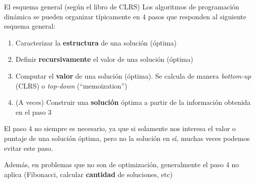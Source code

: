 \documentclass{beamer}
\begin{document}
\begin{frame}{El esquema general (según el libro de CLRS)}
    Los algoritmos de programación dinámica se pueden organizar típicamente en 4 pasos que responden al siguiente esquema general:
   \begin{enumerate}
   \item Caracterizar la \textbf{estructura} de una solución (óptima)
   \item Definir \textbf{recursivamente} el valor de una solución (óptima)
   \item Computar el \textbf{valor} de una solución (óptima). Se calcula de manera \textit{bottom-up} (CLRS) o \textit{top-down} (``memoization'')
   \item (A veces) Construir una \textbf{solución} óptima a partir de la información obtenida en el paso 3
  \end{enumerate}
    El paso 4 no siempre es necesario, ya que si solamente nos interesa el valor o puntaje de una solución óptima, pero no la solución en sí, muchas veces podemos evitar este paso.

    Además, en problemas que no son de optimización, generalmente el paso 4 no aplica (Fibonacci, calcular \textbf{cantidad} de soluciones, etc)

\end{frame}
\end{document}
